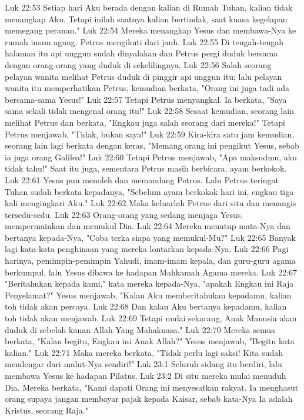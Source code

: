 Luk 22:53  Setiap hari Aku berada dengan kalian di Rumah Tuhan, kalian tidak menangkap Aku. Tetapi inilah saatnya kalian bertindak, saat kuasa kegelapan memegang peranan."
Luk 22:54  Mereka menangkap Yesus dan membawa-Nya ke rumah imam agung. Petrus mengikuti dari jauh.
Luk 22:55  Di tengah-tengah halaman itu api unggun sudah dinyalakan dan Petrus pergi duduk bersama dengan orang-orang yang duduk di sekelilingnya.
Luk 22:56  Salah seorang pelayan wanita melihat Petrus duduk di pinggir api unggun itu; lalu pelayan wanita itu memperhatikan Petrus, kemudian berkata, "Orang ini juga tadi ada bersama-sama Yesus!"
Luk 22:57  Tetapi Petrus menyangkal. Ia berkata, "Saya sama sekali tidak mengenal orang itu!"
Luk 22:58  Sesaat kemudian, seorang lain melihat Petrus dan berkata, "Engkau juga salah seorang dari mereka!" Tetapi Petrus menjawab, "Tidak, bukan saya!"
Luk 22:59  Kira-kira satu jam kemudian, seorang lain lagi berkata dengan keras, "Memang orang ini pengikut Yesus, sebab ia juga orang Galilea!"
Luk 22:60  Tetapi Petrus menjawab, "Apa maksudmu, aku tidak tahu!" Saat itu juga, sementara Petrus masih berbicara, ayam berkokok.
Luk 22:61  Yesus pun menoleh dan memandang Petrus. Lalu Petrus teringat Tuhan sudah berkata kepadanya, "Sebelum ayam berkokok hari ini, engkau tiga kali mengingkari Aku."
Luk 22:62  Maka keluarlah Petrus dari situ dan menangis tersedu-sedu.
Luk 22:63  Orang-orang yang sedang menjaga Yesus, mempermainkan dan memukul Dia.
Luk 22:64  Mereka menutup mata-Nya dan bertanya kepada-Nya, "Coba terka siapa yang memukul-Mu?"
Luk 22:65  Banyak lagi kata-kata penghinaan yang mereka lontarkan kepada-Nya.
Luk 22:66  Pagi harinya, pemimpin-pemimpin Yahudi, imam-imam kepala, dan guru-guru agama berkumpul, lalu Yesus dibawa ke hadapan Mahkamah Agama mereka.
Luk 22:67  "Beritahukan kepada kami," kata mereka kepada-Nya, "apakah Engkau ini Raja Penyelamat?" Yesus menjawab, "Kalau Aku memberitahukan kepadamu, kalian toh tidak akan percaya.
Luk 22:68  Dan kalau Aku bertanya kepadamu, kalian toh tidak akan menjawab.
Luk 22:69  Tetapi mulai sekarang, Anak Manusia akan duduk di sebelah kanan Allah Yang Mahakuasa."
Luk 22:70  Mereka semua berkata, "Kalau begitu, Engkau ini Anak Allah?" Yesus menjawab, "Begitu kata kalian."
Luk 22:71  Maka mereka berkata, "Tidak perlu lagi saksi! Kita sudah mendengar dari mulut-Nya sendiri!"
Luk 23:1  Seluruh sidang itu berdiri, lalu membawa Yesus ke hadapan Pilatus.
Luk 23:2  Di situ mereka mulai menuduh Dia. Mereka berkata, "Kami dapati Orang ini menyesatkan rakyat. Ia menghasut orang supaya jangan membayar pajak kepada Kaisar, sebab kata-Nya Ia adalah Kristus, seorang Raja."
